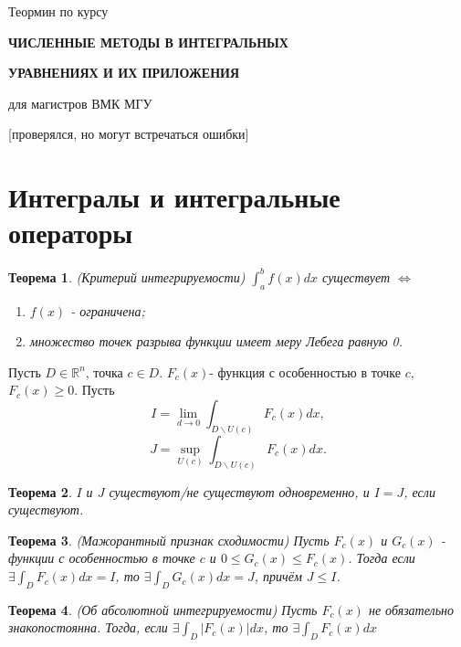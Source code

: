 \documentclass{article}
\newtheorem{theorem}{Теорема}
\begin{document}
\centerline{\huge Теормин по курсу} 
\centerline{\huge \textbf{ЧИСЛЕННЫЕ МЕТОДЫ В ИНТЕГРАЛЬНЫХ }}
\centerline{\huge \textbf{УРАВНЕНИЯХ И ИХ ПРИЛОЖЕНИЯ}}
\centerline{\huge для магистров ВМК МГУ}

\centerline{[проверялся, но могут встречаться ошибки]}

\vspace{0.5cm}



\section{Интегралы и интегральные операторы}



\begin{theorem}
(Критерий интегрируемости) $\int_{a}^{b}f(x)dx$ существует $\Leftrightarrow$ 
\begin{enumerate}
\item $f(x)$ - ограничена;
\item множество точек разрыва функции имеет меру Лебега равную 0.
\end{enumerate}
\end{theorem}
\vspace{0.2cm}

\noindent
Пусть $D\in \mathbb{R}^n$, точка $c \in D$.
$F_c(x)$- функция с особенностью в точке $c$, $F_c(x) \geqslant 0$.
Пусть 
$$I = \lim_{d \to 0} \int_{D \backslash U(c)} F_c(x)dx,$$ 
$$J = \sup_{U(c)} \int_{D \backslash U(c)} F_c(x)dx.$$
\begin{theorem}
$I$ и $J$ существуют/не существуют одновременно, и $I = J$, если существуют. 
\end{theorem}

\begin{theorem}
(Мажорантный признак сходимости) Пусть $F_c(x)$ и $G_c(x)$ - функции с особенностью в точке $c$ и $0 \leqslant G_c(x) \leqslant F_c(x)$. Тогда если $\exists \int_D F_c(x)dx = I$, то $\exists \int_D G_c(x)dx = J$, причём $J \leqslant I$.
\end{theorem}

\begin{theorem}
(Об абсолютной интегрируемости) Пусть $F_c(x)$ не обязательно знакопостоянна. Тогда, если $\exists \int_D |F_c(x)|dx$, то $\exists \int_D F_c(x)dx$
\end{theorem}
\end{document}
